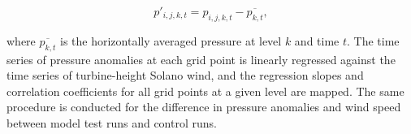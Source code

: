 \begin{equation}
p'_{i,j,k,t} = p_{i,j,k,t} - \overline{p_{k,t}},
\end{equation}

where $\overline{p_{k,t}}$ is the horizontally averaged pressure at level $k$ and time $t$.  The time series of pressure anomalies at each grid point is linearly regressed against the time series of turbine-height Solano wind, and the regression slopes and correlation coefficients for all grid points at a given level are mapped.  The same procedure is conducted for the difference in pressure anomalies and wind speed between model test runs and control runs.

%